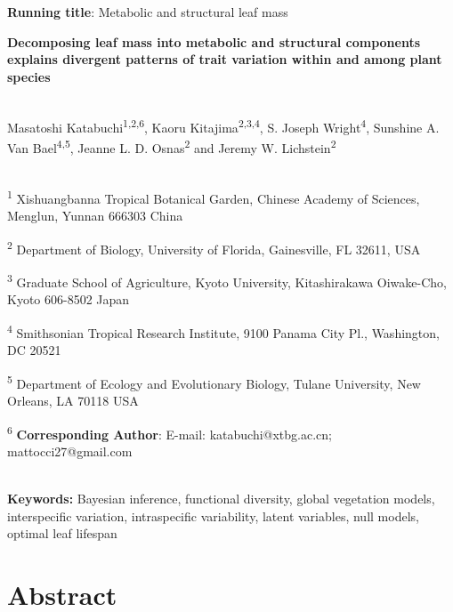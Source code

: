 \documentclass[
  12pt,
  letterpaper,
  DIV=11,
  numbers=noendperiod]{scrartcl}
\author{}
\date{}
\begin{document}
\ifdefined\Shaded\renewenvironment{Shaded}{\begin{tcolorbox}[interior hidden, enhanced, boxrule=0pt, sharp corners, frame hidden, borderline west={3pt}{0pt}{shadecolor}, breakable]}{\end{tcolorbox}}\fi

\textbf{Running title}: Metabolic and structural leaf mass

\textbf{Decomposing leaf mass into metabolic and structural components
explains divergent patterns of trait variation within and among plant
species}\\
\strut \\
Masatoshi Katabuchi\textsuperscript{1,2,6}, Kaoru
Kitajima\textsuperscript{2,3,4}, S. Joseph Wright\textsuperscript{4},
Sunshine A. Van Bael\textsuperscript{4,5}, Jeanne L. D.
Osnas\textsuperscript{2} and Jeremy W. Lichstein\textsuperscript{2}\\
\strut \\
\textsuperscript{1} Xishuangbanna Tropical Botanical Garden, Chinese
Academy of Sciences, Menglun, Yunnan 666303 China

\textsuperscript{2} Department of Biology, University of Florida,
Gainesville, FL 32611, USA

\textsuperscript{3} Graduate School of Agriculture, Kyoto University,
Kitashirakawa Oiwake-Cho, Kyoto 606-8502 Japan

\textsuperscript{4} Smithsonian Tropical Research Institute, 9100 Panama
City Pl., Washington, DC 20521

\textsuperscript{5} Department of Ecology and Evolutionary Biology,
Tulane University, New Orleans, LA 70118 USA

\textsuperscript{6} \textbf{Corresponding Author}: E-mail:
katabuchi@xtbg.ac.cn; mattocci27@gmail.com\\
\strut \\
\textbf{Keywords:} Bayesian inference, functional diversity, global
vegetation models, interspecific variation, intraspecific variability,
latent variables, null models, optimal leaf lifespan

\newpage

\hypertarget{abstract}{%
\section{Abstract}\label{abstract}}
\end{document}
